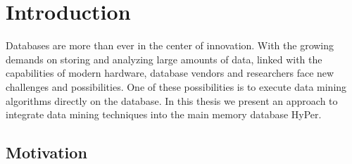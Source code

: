 \chapter{Introduction}\label{chapter:introduction}

Databases are more than ever in the center of innovation. With the growing demands on storing and analyzing large amounts of data, linked with the capabilities of modern hardware, database vendors and researchers face new challenges and possibilities. One of these possibilities is to execute data mining algorithms directly on the database. In this thesis we present an approach to integrate data mining techniques into the main memory database HyPer.

\section{Motivation}

